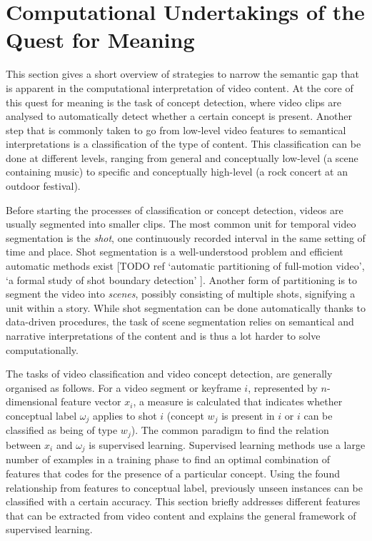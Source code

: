 
\section{Computational Undertakings of the Quest for Meaning}

This section gives a short overview of strategies to narrow the semantic gap that is apparent in the computational interpretation of video content. At the core of this quest for meaning is the task of concept detection\cite{Snoek:2009dq}, where video clips are analysed to automatically detect whether a certain concept is present. Another step that is commonly taken to go from low-level video features to semantical interpretations is a classification of the type of content. This classification can be done at different levels, ranging from general and conceptually low-level (a scene containing music) to specific and conceptually high-level (a rock concert at an outdoor festival)\cite{Wang:2000vf}.

Before starting the processes of classification or concept detection, videos are usually segmented into smaller clips. The most common unit for temporal video segmentation is the \emph{shot}, one continuously recorded interval in the same setting of time and place. Shot segmentation is a well-understood problem and efficient automatic methods exist [TODO ref `automatic partitioning of full-motion video', `a formal study of shot boundary detection' ]. Another form of partitioning is to segment the video into \emph{scenes}, possibly consisting of multiple shots, signifying a unit within a story\cite{Wang:2000vf}. While shot segmentation can be done automatically thanks to data-driven procedures, the task of scene segmentation relies on semantical and narrative interpretations of the content and is thus a lot harder to solve computationally.

The tasks of video classification and video concept detection, are generally organised as follows. For a video segment or keyframe $i$, represented by $n$-dimensional feature vector $x_i$, a measure is calculated that indicates whether conceptual label $\omega_j$ applies to shot $i$ (concept $w_j$ is present in $i$ or  $i$ can be classified as being of type $w_j$). The common paradigm to find the relation between $x_i$ and $\omega_j$ is supervised learning. Supervised learning methods use a large number of examples in a training phase to find an optimal combination of features that codes for the presence of a particular concept. Using the found relationship from features to conceptual label, previously unseen instances can be classified with a certain accuracy. This section briefly addresses different features that can be extracted from video content and explains the general framework of supervised learning.

